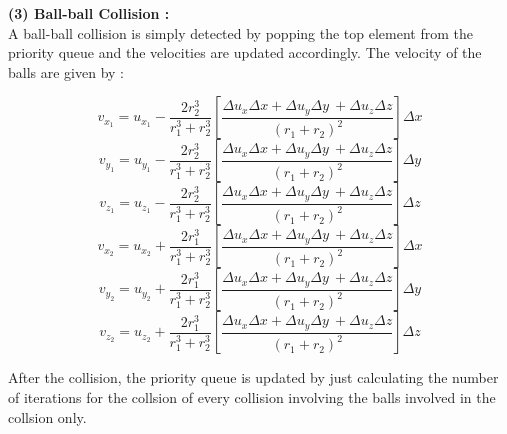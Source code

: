 \documentclass[a4paper]{article}
\begin{document}
\textbf{(3) Ball-ball Collision : }\\
A ball-ball collision is simply detected by popping the top element from the priority queue and the velocities are updated accordingly. The velocity of the balls are given by :

\begin{equation}
v_{x_1} = u_{x_1} - \frac{2r_2^3}{r_1^3 + r_2^3}\left[\frac{\Delta u_x\Delta x + \Delta u_y\Delta y\ + \Delta u_z\Delta z }{(r_1 + r_2)^2} \right]\Delta x
\end{equation}
\begin{equation}
v_{y_1} = u_{y_1} - \frac{2r_2^3}{r_1^3 + r_2^3}\left[\frac{\Delta u_x\Delta x + \Delta u_y\Delta y\ + \Delta u_z\Delta z }{(r_1 + r_2)^2} \right]\Delta y
\end{equation}
\begin{equation}
v_{z_1} = u_{z_1} - \frac{2r_2^3}{r_1^3 + r_2^3}\left[\frac{\Delta u_x\Delta x + \Delta u_y\Delta y\ + \Delta u_z\Delta z }{(r_1 + r_2)^2} \right]\Delta z
\end{equation}
\begin{equation}
v_{x_2} = u_{x_2} + \frac{2r_1^3}{r_1^3 + r_2^3}\left[\frac{\Delta u_x\Delta x + \Delta u_y\Delta y\ + \Delta u_z\Delta z }{(r_1 + r_2)^2} \right]\Delta x
\end{equation}
\begin{equation}
v_{y_2} = u_{y_2} + \frac{2r_1^3}{r_1^3 + r_2^3}\left[\frac{\Delta u_x\Delta x + \Delta u_y\Delta y\ + \Delta u_z\Delta z }{(r_1 + r_2)^2} \right]\Delta y
\end{equation}
\begin{equation}
v_{z_2} = u_{z_2} + \frac{2r_1^3}{r_1^3 + r_2^3}\left[\frac{\Delta u_x\Delta x + \Delta u_y\Delta y\ + \Delta u_z\Delta z }{(r_1 + r_2)^2} \right]\Delta z
\end{equation}

After the collision, the priority queue is updated by just calculating the number of iterations for the collsion of every collision involving the balls involved in the collsion only.
\end{document}
